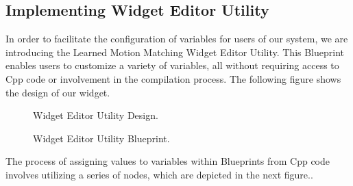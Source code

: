 \documentclass[12pt]{book}
\begin{document}
\subsection{Implementing Widget Editor Utility}
In order to facilitate the configuration of variables for users of our system, we are introducing the Learned Motion Matching Widget Editor Utility. This Blueprint enables users to customize a variety of variables, all without requiring access to Cpp code or involvement in the compilation process. The following figure shows the design of our widget.

\begin{figure}[!h]
    \centering
    \caption{Widget Editor Utility Design.}
\end{figure}
\newpage
\begin{figure}[!h]
    \centering
    \caption{Widget Editor Utility Blueprint.}
\end{figure}
The process of assigning values to variables within Blueprints from Cpp code involves utilizing a series of nodes, which are depicted in the next figure..

\newpage
\end{document}
